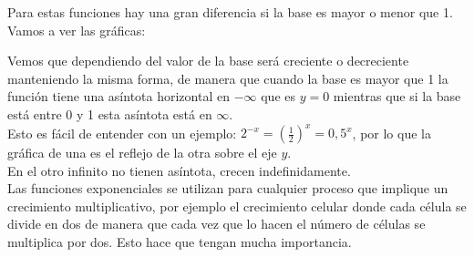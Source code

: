 \documentclass[a4paper,11pt,answers]{exam}
\begin{document}
Para estas funciones hay una gran diferencia si la base es mayor o menor que 1. Vamos a ver las gráficas:
\begin{center}
\hspace{1cm}
\end{center}
Vemos que dependiendo del valor de la base será creciente o decreciente manteniendo la misma forma, de manera que cuando la base es mayor que 1 la función tiene una asíntota horizontal en $-\infty$ que es $y=0$ mientras que si la base está entre 0 y 1 esta asíntota está en $\infty$.\\
Esto es fácil de entender con un ejemplo: $2^{-x} = \left(\frac{1}{2}\right)^x = 0,5^x$, por lo que la gráfica de una es el reflejo de la otra sobre el eje $y$.\\
En el otro infinito no tienen asíntota, crecen indefinidamente.\\

Las funciones exponenciales se utilizan para cualquier proceso que implique un crecimiento multiplicativo, por ejemplo el crecimiento celular donde cada célula se divide en dos de manera que cada vez que lo hacen el número de células se multiplica por dos. Esto hace que tengan mucha importancia.\\
\end{document}

